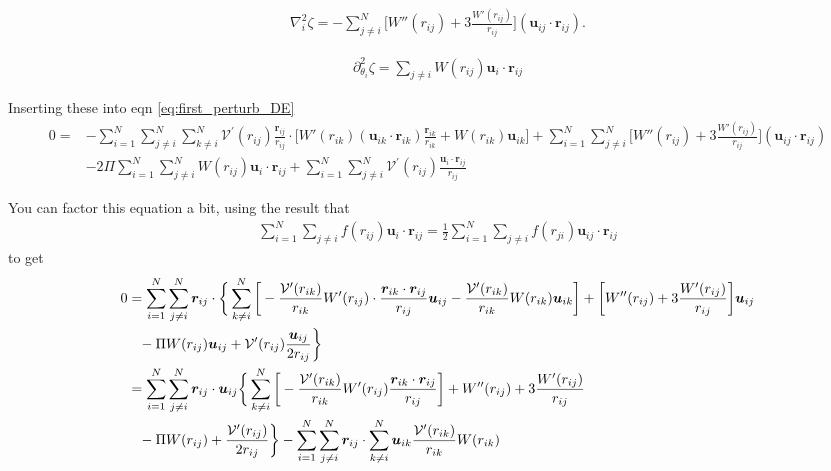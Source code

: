 \documentclass{article}
\begin{document}
\begin{align}
  \nabla_i^2\zeta=-\sum_{j\neq i}^N\bigg[W''(r_{ij})
  +3\frac{W'(r_{ij})}{r_{ij}}\bigg](\bm{u}_{ij}\cdot\bm{r}_{ij}).
\end{align}

\begin{align}
  \partial_{\theta_i}^2\zeta=\sum_{j\neq i}W(r_{ij})\bm{u}_i\cdot\bm{r}_{ij}
\end{align}

Inserting these into eqn \ref{eq:first_perturb_DE}
\begin{align}
  0=
  &-\sum_{i=1}^N\sum_{j\neq i}^N\sum_{k\neq i}^N
    \mathcal{V}^{\prime}(r_{ij})\frac{\bm{r}_{ij}}{r_{ij}}
    \cdot\bigg[W'(r_{ik})
    (\bm{u}_{ik}\cdot\bm{r}_{ik})\frac{\bm{r}_{ik}}{r_{ik}}
    +W(r_{ik})\bm{u}_{ik}\bigg]
    +\sum_{i=1}^N\sum_{j\neq i}^N\bigg[W''(r_{ij})
    +3\frac{W'(r_{ij})}{r_{ij}}\bigg](\bm{u}_{ij}\cdot\bm{r}_{ij})\nonumber\\
  &-2\Pi\sum_{i=1}^N\sum_{j\neq i}^NW(r_{ij})\bm{u}_i\cdot\bm{r}_{ij}
   +\sum_{i=1}^N\sum_{j\neq i}^N 
    \mathcal{V}^{\prime}(r_{ij})\frac{\bm{u}_i\cdot\bm{r}_{ij}}{r_{ij}}
\end{align}

You can factor this equation a bit, using the result that
\begin{align}
  \sum_{i=1}^N\sum_{j\neq i}f(r_{ij}) \bm{u}_i\cdot\bm{r}_{ij}
  =\frac{1}{2}\sum_{i=1}^N\sum_{j\neq i}f(r_{ji})\bm{u}_{ij}\cdot\bm{r}_{ij}
\end{align}
  to get
\begin{align}\label{eq:WODE_exact}
  0&=
     \sum_{i=1}^N\sum_{j\neq i}^N\bm{r}_{ij}\cdot\bigg\{\sum_{k\neq i}^N\bigg[
     -\frac{\mathcal{V}^{\prime}(r_{ik})}{r_{ik}}
     W'(r_{ij})
     \cdot\frac{\bm{r}_{ik}\cdot\bm{r}_{ij}}{r_{ij}}\bm{u}_{ij}
     -\frac{\mathcal{V}^{\prime}(r_{ik})}{r_{ik}}W(r_{ik})\bm{u}_{ik}\bigg]
     +\bigg[W''(r_{ij})
     +3\frac{W'(r_{ij})}{r_{ij}}\bigg]\bm{u}_{ij}\nonumber\\
   &\hphantom{=}-\Pi W(r_{ij})\bm{u}_{ij}
     +\mathcal{V}^{\prime}(r_{ij})\frac{\bm{u}_{ij}}{2r_{ij}}\bigg\}\nonumber\\
   &=\sum_{i=1}^N\sum_{j\neq i}^N\bm{r}_{ij}\cdot\bm{u}_{ij}
     \bigg\{\sum_{k\neq i}^N\bigg[
     -\frac{\mathcal{V}^{\prime}(r_{ik})}{r_{ik}}
     W'(r_{ij})\frac{\bm{r}_{ik}\cdot\bm{r}_{ij}}{r_{ij}}\bigg]
     +W''(r_{ij})+3\frac{W'(r_{ij})}{r_{ij}}\nonumber\\
   &\hphantom{=}-\Pi W(r_{ij})
     +\frac{\mathcal{V}^{\prime}(r_{ij})}{2r_{ij}}\bigg\}
     -\sum_{i=1}^N\sum_{j\neq i}^N\bm{r}_{ij}\cdot\sum_{k\neq i}^N
     \bm{u}_{ik}\frac{\mathcal{V}^{\prime}(r_{ik})}{r_{ik}}W(r_{ik})
\end{align}
\end{document}
